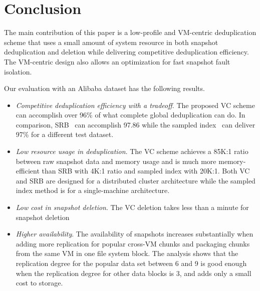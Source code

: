 \section{Conclusion}
\label{sect:conclusion}
The main contribution of this paper is a low-profile and VM-centric deduplication scheme that
uses  a small amount of system resource in both snapshot deduplication and deletion
while delivering competitive deduplication efficiency.
The VM-centric design also allows an optimization for  fast snapshot fault isolation.
 
Our evaluation with an Alibaba dataset has the following results.
\begin{itemize}
\item {\em Competitive deduplication efficiency with a tradeoff}. 
The proposed VC scheme 
can accomplish over  96\% of what complete global
deduplication can do. In comparison, SRB~\cite{Dong2011,extreme_binning09}
can accomplish 97.86 while 
the sampled index~\cite{Guo2011} can deliver 97\% for a different test dataset. 
\item {\em Low resource usage in deduplication}. 
The VC scheme achieves a 85K:1 ratio between raw snapshot data and memory usage
and is much more memory-efficient than 
SRB  with 4K:1 ratio and sampled index with 20K:1.
Both VC and SRB are designed for a distributed cluster architecture while
the sampled index method is for a single-machine architecture.
\item {\em Low cost in snapshot deletion}. 
The VC deletion takes less than a minute for snapshot deletion 
\item {\em Higher availability}. 
The availability of snapshots increases substantially when
adding more replication for popular cross-VM chunks and packaging chunks from the same 
VM in one file system block. The analysis shows that the replication degree
for the popular data set between 6 and 9 is good enough when the replication degree
for other data blocks is 3, and adds only a small cost to storage.
\end{itemize}



